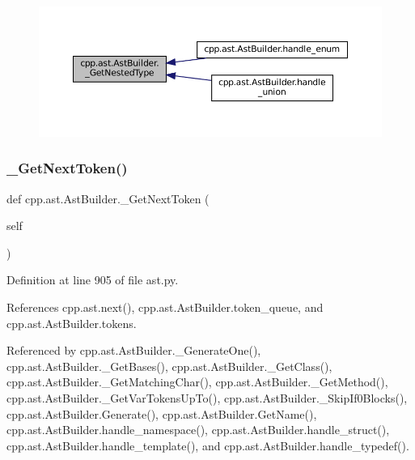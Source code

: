 \begin{figure}[H]
\begin{center}
\leavevmode
\includegraphics[width=350pt]{classcpp_1_1ast_1_1AstBuilder_a5d691eeae461945d88601fc2f2dce3cb_icgraph}
\end{center}
\end{figure}
\mbox{\label{classcpp_1_1ast_1_1AstBuilder_ac22b5683a8f1a86a49751d6d0bcd4b84}} 
\subsubsection{\texorpdfstring{\+\_\+\+Get\+Next\+Token()}{\_GetNextToken()}}
{\footnotesize\ttfamily def cpp.\+ast.\+Ast\+Builder.\+\_\+\+Get\+Next\+Token (\begin{DoxyParamCaption}\item[{}]{self }\end{DoxyParamCaption})\hspace{0.3cm}{\ttfamily [private]}}



Definition at line 905 of file ast.\+py.



References cpp.\+ast.\+next(), cpp.\+ast.\+Ast\+Builder.\+token\+\_\+queue, and cpp.\+ast.\+Ast\+Builder.\+tokens.



Referenced by cpp.\+ast.\+Ast\+Builder.\+\_\+\+Generate\+One(), cpp.\+ast.\+Ast\+Builder.\+\_\+\+Get\+Bases(), cpp.\+ast.\+Ast\+Builder.\+\_\+\+Get\+Class(), cpp.\+ast.\+Ast\+Builder.\+\_\+\+Get\+Matching\+Char(), cpp.\+ast.\+Ast\+Builder.\+\_\+\+Get\+Method(), cpp.\+ast.\+Ast\+Builder.\+\_\+\+Get\+Var\+Tokens\+Up\+To(), cpp.\+ast.\+Ast\+Builder.\+\_\+\+Skip\+If0\+Blocks(), cpp.\+ast.\+Ast\+Builder.\+Generate(), cpp.\+ast.\+Ast\+Builder.\+Get\+Name(), cpp.\+ast.\+Ast\+Builder.\+handle\+\_\+namespace(), cpp.\+ast.\+Ast\+Builder.\+handle\+\_\+struct(), cpp.\+ast.\+Ast\+Builder.\+handle\+\_\+template(), and cpp.\+ast.\+Ast\+Builder.\+handle\+\_\+typedef().


